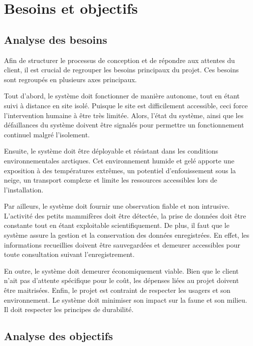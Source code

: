 %
%

\chapter{Besoins et objectifs}
\label{s:objectifs}
\section{Analyse des besoins}
Afin de structurer le processus de conception et de répondre aux attentes du client, il est crucial de regrouper les besoins principaux du projet.
Ces besoins sont regroupés en plusieurs axes principaux.

\bigskip
Tout d’abord, le système doit fonctionner de manière autonome, tout en étant suivi à distance en site isolé.
Puisque le site est difficilement accessible, ceci force l’intervention humaine à être très limitée.
Alors, l’état du système, ainsi que les défaillances du système doivent être signalés pour permettre un fonctionnement continuel malgré l’isolement.

\bigskip
Ensuite, le système doit être déployable et résistant dans les conditions environnementales arctiques. Cet environnement humide et gelé apporte une exposition à des températures extrêmes, un potentiel d’enfouissement sous la neige, un transport complexe et limite les ressources accessibles lors de l’installation.

\bigskip
Par ailleurs, le système doit fournir une observation fiable et non intrusive.
L’activité des petits mammifères doit être détectée, la prise de données doit être constante tout en étant exploitable scientifiquement.
De plus, il faut que le système assure la gestion et la conservation des données enregistrées.
En effet, les informations recueillies doivent être sauvegardées et demeurer accessibles pour toute consultation suivant l’enregistrement.

\bigskip
En outre, le système doit demeurer économiquement viable.
Bien que le client n’ait pas d’attente spécifique pour le coût, les dépenses liées au projet doivent être maitrisées.
Enfin, le projet est contraint de respecter les usagers et son environnement. Le système doit minimiser son impact sur la faune et son milieu.
Il doit respecter les principes de durabilité.

\newpage
\section{Analyse des objectifs}

